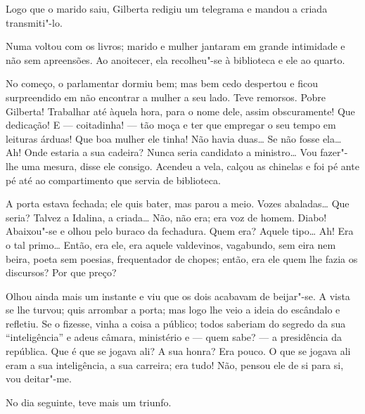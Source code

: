 Logo que o marido saiu, Gilberta redigiu um telegrama e mandou a criada
transmiti"-lo.

Numa voltou com os livros; marido e mulher jantaram em grande intimidade
e não sem apreensões. Ao anoitecer, ela recolheu"-se à biblioteca e ele
ao quarto.

No começo, o parlamentar dormiu bem; mas bem cedo despertou e ficou
surpreendido em não encontrar a mulher a seu lado. Teve remorsos. Pobre
Gilberta! Trabalhar até àquela hora, para o nome dele, assim
obscuramente! Que dedicação! E --- coitadinha! --- tão moça e ter que
empregar o seu tempo em leituras árduas! Que boa mulher ele tinha! Não
havia duas\ldots{} Se não fosse ela\ldots{} Ah! Onde estaria a sua
cadeira? Nunca seria candidato a ministro\ldots{} Vou fazer"-lhe uma
mesura, disse ele consigo. Acendeu a vela, calçou as chinelas e foi pé
ante pé até ao compartimento que servia de biblioteca.

A porta estava fechada; ele quis bater, mas parou a meio. Vozes
abaladas\ldots{} Que seria? Talvez a Idalina, a criada\ldots{} Não, não
era; era voz de homem. Diabo! Abaixou"-se e olhou pelo buraco da
fechadura. Quem era? Aquele tipo\ldots{} Ah! Era o tal primo\ldots{}
Então, era ele, era aquele valdevinos, vagabundo, sem eira nem beira,
poeta sem poesias, frequentador de chopes; então, era ele quem lhe fazia
os discursos? Por que preço?

Olhou ainda mais um instante e viu que os dois acabavam de beijar"-se. A
vista se lhe turvou; quis arrombar a porta; mas logo lhe veio a ideia do
escândalo e refletiu. Se o fizesse, vinha a coisa a público; todos
saberiam do segredo da sua ``inteligência'' e adeus câmara, ministério e
--- quem sabe? --- a presidência da república. Que é que se jogava ali? A
sua honra? Era pouco. O que se jogava ali eram a sua inteligência, a sua
carreira; era tudo! Não, pensou ele de si para si, vou deitar"-me.

No dia seguinte, teve mais um triunfo.


